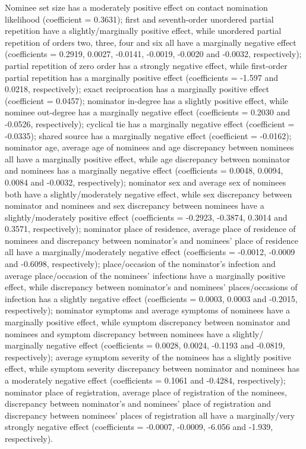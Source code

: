 Nominee set size has a moderately positive effect on contact nomination likelihood (coefficient = 0.3631); first and seventh-order unordered partial repetition have a slightly/marginally positive effect, while unordered partial repetition of orders two, three, four and six all have a marginally negative effect (coefficients = 0.2919, 0.0027, -0.0141, -0.0019, -0.0020 and -0.0032, respectively); partial repetition of zero order has a strongly negative effect, while first-order partial repetition has a marginally positive effect (coefficients = -1.597 and 0.0218, respectively); exact reciprocation has a marginally positive effect (coefficient = 0.0457); nominator in-degree has a slightly positive effect, while nominee out-degree has a marginally negative effect (coefficients = 0.2030 and -0.0526, respectively); cyclical tie has a marginally negative effect (coefficient = -0.0335); shared source has a marginally negative effect (coefficient = -0.0162); nominator age, average age of nominees and age discrepancy between nominees all have a marginally positive effect, while age discrepancy between nominator and nominees has a marginally negative effect (coefficients = 0.0048, 0.0094, 0.0084 and -0.0032, respectively); nominator sex and average sex of nominees both have a slightly/moderately negative effect, while sex discrepancy between nominator and nominees and sex discrepancy between nominees have a slightly/moderately positive effect (coefficients = -0.2923, -0.3874, 0.3014 and 0.3571, respectively); nominator place of residence, average place of residence of nominees and discrepancy between nominator's and nominees' place of residence all have a marginally/moderately negative effect (coefficients = -0.0012, -0.0009 and -0.6098, respectively); place/occasion of the nominator's infection and average place/occasion of the nominees' infections have a marginally positive effect, while discrepancy between nominator's and nominees' places/occasions of infection has a slightly negative effect (coefficients = 0.0003, 0.0003 and -0.2015, respectively); nominator symptoms and average symptoms of nominees have a marginally positive effect, while symptom discrepancy between nominator and nominees and symptom discrepancy between nominees have a slightly/
marginally negative effect (coefficients = 0.0028, 0.0024, -0.1193 and -0.0819, respectively); average symptom severity of the nominees has a slightly positive effect, while symptom severity discrepancy between nominator and nominees has a moderately negative effect (coefficients = 0.1061 and -0.4284, respectively); nominator place of registration, average place of registration of the nominees, discrepancy between nominator's and nominees' place of registration and discrepancy between nominees' places of registration all have a marginally/very strongly negative effect (coefficients = -0.0007, -0.0009, -6.056 and -1.939, respectively).

